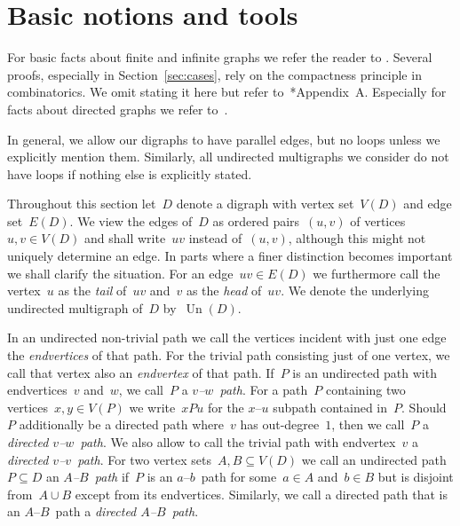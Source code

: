\documentclass[reqno, 12pt]{amsart}
\numberwithin{equation}{section}
\numberwithin{figure}{section}
\theoremstyle{plain}
\theoremstyle{definition}
\DeclareMathOperator{\Un}{Un}
\begin{document}
\section{Basic notions and tools}
\label{sec:prelims}


For basic facts about finite and infinite graphs we refer the reader to \cite{diestel_buch}. 
Several proofs, especially in Section~\ref{sec:cases}, rely on the compactness principle in combinatorics.
We omit stating it here but refer to~\cite{diestel_buch}*{Appendix~A}. 
Especially for facts about directed graphs we refer to~\cite{bang-jensen}. 

In general, we allow our digraphs to have parallel edges, but no loops unless we explicitly mention them. 
Similarly, all undirected multigraphs we consider do not have loops if nothing else is explicitly stated. 

\vspace{0.2cm}

Throughout this section let~$D$ denote a digraph with vertex set~$V(D)$ and edge set~$E(D)$. 
We view the edges of~$D$ as ordered pairs~${(u,v)}$ of vertices~${u, v \in V(D)}$ and shall write~${uv}$ instead of~${(u, v)}$, although this might not uniquely determine an edge.
In parts where a finer distinction becomes important we shall clarify the situation.
For an edge~${uv \in E(D)}$ we furthermore call the vertex~$u$ as the \emph{tail} of~${uv}$ and~$v$ as the \emph{head} of~$uv$.
We denote the underlying undirected multigraph of~$D$ by~$\Un(D)$.

In an undirected non-trivial path we call the vertices incident with just one edge the \emph{endvertices} of that path.
For the trivial path consisting just of one vertex, we call that vertex also an \emph{endvertex} of that path.
If~$P$ is an undirected path with endvertices~$v$ and~$w$, we call~$P$ a \emph{$v$--$w$~path}.
For a path~$P$ containing two vertices~${x, y \in V(P)}$ we write~${xPu}$ for the $x$--$u$ subpath contained in~$P$.
Should~$P$ additionally be a directed path where~$v$ has out-degree~$1$, then we call~$P$ a \emph{directed $v$--$w$~path}.
We also allow to call the trivial path with endvertex~$v$ a \emph{directed $v$--$v$~path}.
For two vertex sets~${A, B \subseteq V(D)}$ we call an undirected path~${P \subseteq D}$ an \emph{$A$--$B$~path} if~$P$ is an $a$--$b$~path for some~${a \in A}$ and~${b \in B}$ but is disjoint from~${A \cup B}$ except from its endvertices.
Similarly, we call a directed path that is an $A$--$B$~path a \emph{directed $A$--$B$~path}.
\end{document}

